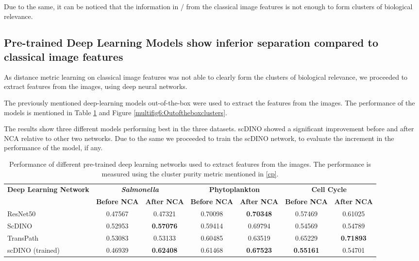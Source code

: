 \documentclass[12pt,a4paper]{article}
\begin{document}
Due to the same, it can be noticed that the information in / from the classical image features is not enough to form clusters of biological relevance.

\subsection{Pre-trained Deep Learning Models show inferior separation compared to classical image features}
As distance metric learning on classical image features was not able to clearly form the clusters of biological relevance, we proceeded to extract features from the images, using deep neural networks.

The previously mentioned deep-learning models out-of-the-box were used to extract the features from the images. The performance of the models is mentioned in Table \ref{tab:performanceofdl} and Figure \ref{multifig6:Outoftheboxclusters}.

The results show three different models performing best in the three datasets. scDINO showed a significant improvement before and after NCA relative to other two networks. Due to the same we proceeded to train the scDINO network, to evaluate the increment in the performance of the model, if any.


\begin{table}[h]
\centering
\footnotesize
\caption{Performance of different pre-trained deep learning networks used to extract features from the images. The performance is measured using the cluster purity metric mentioned in \ref{cp}.}
\label{tab:performanceofdl}
\begin{tabular}{@{}p{1.8cm}cccccc@{}}
\toprule
\textbf{Deep Learning Network} & \multicolumn{2}{c}{\textbf{\textit{Salmonella}}} & \multicolumn{2}{c}{\textbf{Phytoplankton}} & \multicolumn{2}{c}{\textbf{Cell Cycle}} \\
& \textbf{Before NCA} & \textbf{After NCA} & \textbf{Before NCA} & \textbf{After NCA} & \textbf{Before NCA} & \textbf{After NCA} \\
\midrule
ResNet50 & 0.47567 & 0.47321 & 0.70098 & \textbf{0.70348} & 0.57469 & 0.61025 \\
ScDINO  & 0.52953 & \textbf{0.57076} & 0.59414 & 0.69794 & 0.54569 & 0.54789 \\
TransPath & 0.53083 & 0.53133 & 0.60485 & 0.63519 & 0.65229 & \textbf{0.71893} \\
scDINO (trained) & 0.46939 & \textbf{0.62408} & 0.61468 & \textbf{0.67523} & \textbf{0.55161} & 0.54701\\
\bottomrule
\end{tabular}
\end{table}
\end{document}
